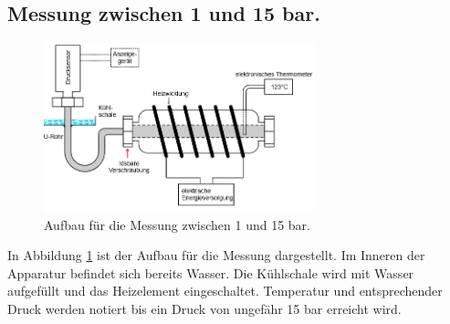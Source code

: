 \subsection{Messung zwischen 1 und 15 bar.}
\begin{figure}
  \centering
  \includegraphics[width=0.7\textwidth]{aufbau2.PNG}
  \caption{Aufbau für die Messung zwischen 1 und 15 bar.}
  \label{fig:aufbau2}
\end{figure}
In Abbildung \ref{fig:aufbau2} ist der Aufbau für die Messung dargestellt. Im Inneren der Apparatur befindet sich bereits Wasser.
Die Kühlschale wird mit Wasser aufgefüllt und das Heizelement eingeschaltet.
Temperatur und entsprechender Druck werden notiert bis ein Druck von ungefähr 15 bar erreicht wird.

